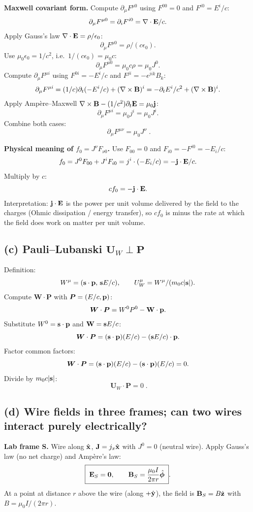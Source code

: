\documentclass[11pt]{article}
\begin{document}
\textbf{Maxwell covariant form.} Compute $\partial_\mu F^{\mu 0}$ using $F^{00}=0$ and $F^{i0} = E^i/c$:
\[
\partial_\mu F^{\mu 0} = \partial_i F^{i0} = \nabla\cdot\vb E/c.
\]
Apply Gauss's law $\nabla\cdot\vb E = \rho/\epsilon_0$:
\[
\partial_\mu F^{\mu 0} = \rho/(c\epsilon_0).
\]
Use $\mu_0\epsilon_0 = 1/c^2$, i.e.\ $1/(c\epsilon_0)=\mu_0 c$:
\[
\partial_\mu F^{\mu 0} = \mu_0 c\rho = \mu_0 J^0.
\]
Compute $\partial_\mu F^{\mu i}$ using $F^{0i}=-E^i/c$ and $F^{ji}=-\epsilon^{jik}B_k$:
\[
\partial_\mu F^{\mu i} = (1/c)\partial_t(-E^i/c) + (\nabla\times\vb B)^i = -\partial_t E^i/c^2 + (\nabla\times\vb B)^i.
\]
Apply Amp\`ere--Maxwell $\nabla\times\vb B - (1/c^2)\partial_t\vb E = \mu_0\vb j$:
\[
\partial_\mu F^{\mu i} = \mu_0 j^i = \mu_0 J^i.
\]
Combine both cases:
\[
\boxed{\;\partial_\mu F^{\mu\nu} = \mu_0 J^\nu\;}.
\]

\textbf{Physical meaning of $f_0 = J^\nu F_{\nu 0}$.} Use $F_{00}=0$ and $F_{i0} = -F^{i0} = -E_i/c$:
\[
f_0 = J^0 F_{00} + J^i F_{i0} = j^i\cdot(-E_i/c) = -\vb j\cdot\vb E/c.
\]
Multiply by $c$:
\[
c f_0 = -\vb j\cdot\vb E.
\]
Interpretation: $\vb j\cdot\vb E$ is the power per unit volume delivered by the field to the charges (Ohmic dissipation / energy transfer), so $cf_0$ is minus the rate at which the field does work on matter per unit volume.

\subsection*{(c) Pauli--Lubanski $\bm U_W \perp \bm P$}

Definition:
\[
W^\mu = (\vb s\cdot\vb p,\,\vb s E/c),\qquad U_W^\mu = W^\mu/(m_0 c|\vb s|).
\]
Compute $\bm W\cdot\bm P$ with $\bm P = (E/c,\vb p)$:
\[
\bm W\cdot\bm P = W^0 P^0 - \vb W\cdot\vb p.
\]
Substitute $W^0 = \vb s\cdot\vb p$ and $\vb W = \vb s E/c$:
\[
\bm W\cdot\bm P = (\vb s\cdot\vb p)(E/c) - (\vb s E/c)\cdot\vb p.
\]
Factor common factors:
\[
\bm W\cdot\bm P = (\vb s\cdot\vb p)(E/c) - (\vb s\cdot\vb p)(E/c) = 0.
\]
Divide by $m_0 c|\vb s|$:
\[
\boxed{\;\bm U_W\cdot\bm P = 0\;}.
\]

\subsection*{(d) Wire fields in three frames; can two wires interact purely electrically?}

\textbf{Lab frame S.} Wire along $\hat{\vb x}$, $\vb J = j_x\hat{\vb x}$ with $J^0=0$ (neutral wire). Apply Gauss's law (no net charge) and Amp\`ere's law:
\[
\boxed{\;\vb E_S = \vb 0,\qquad \vb B_S = \frac{\mu_0 I}{2\pi r}\hat{\bm\phi}\;}.
\]
At a point at distance $r$ above the wire (along $+\hat{\vb y}$), the field is $\vb B_S = B\hat{\vb z}$ with $B = \mu_0 I/(2\pi r)$.
\end{document}
